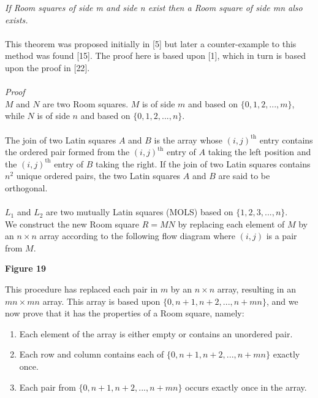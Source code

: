 \documentclass[
  12pt,
  a4paper]{book}
\begin{document}
\emph{If Room squares of side m and side n exist then a Room square of side
mn also exists.}\\
~\\
This theorem was proposed initially in {[}5{]} but later a counter-example
to this method was found {[}15{]}. The proof here is based upon {[}1{]}, which
in turn is based upon the proof in {[}22{]}.\\
~\\
\emph{Proof}\\
\(M\) and \(N\) are two Room squares. \(M\) is of side \(m\) and based on
\(\{0,1,2,...,m\}\), while \(N\) is of side \(n\) and based on
\(\{0,1,2,...,n\}\).\\
~\\
The join of two Latin squares \(A\) and \(B\) is the array whose
\((i,j)^{\mathrm{th}}\) entry contains the ordered pair formed from the
\((i,j)^{\mathrm{th}}\) entry of \(A\) taking the left position and the
\((i,j)^{\mathrm{th}}\) entry of \(B\) taking the right. If the join of two
Latin squares contains \(n^2\) unique ordered pairs, the two Latin squares
\(A\) and \(B\) are said to be orthogonal.\\
~\\
\(L_1\) and \(L_2\) are two mutually Latin squares (MOLS) based on
\(\{1,2,3,...,n\}\).\\
We construct the new Room square \(R=MN\) by replacing each element of \(M\)
by an \(n \times n\) array according to the following flow diagram where
\((i,j)\) is a pair from \(M\).

\textbf{Figure 19}

This procedure has replaced each pair in \(m\) by an \(n \times n\) array,
resulting in an \(mn \times mn\) array. This array is based upon
\(\{0,n+1,n+2,...,n+mn\}\), and we now prove that it has the properties of
a Room square, namely:

\begin{enumerate}
\def\labelenumi{\arabic{enumi}.}
\item
  Each element of the array is either empty or contains an unordered
  pair.
\item
  Each row and column contains each of \(\{0,n+1,n+2,...,n+mn\}\)
  exactly once.
\item
  Each pair from \(\{0,n+1,n+2,...,n+mn\}\) occurs exactly once in the
  array.
\end{enumerate}
\end{document}
